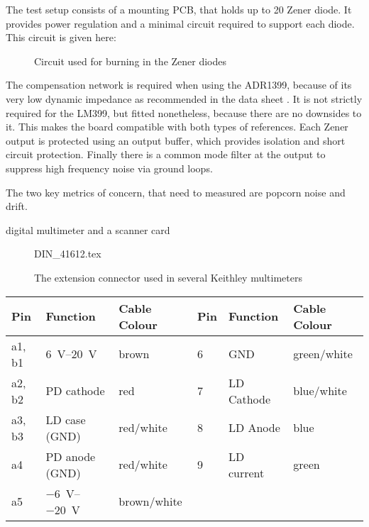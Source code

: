The test setup consists of a mounting PCB, that holds up to 20 Zener diode. It provides power regulation and a minimal circuit required to support each diode. This circuit is given here:

\begin{figure}[ht]
    \centering
    \caption{Circuit used for burning in the Zener diodes}
\end{figure}

The compensation network is required when using the ADR1399, because of its very low dynamic impedance as recommended in the data sheet \cite{datasheet_ADR1399}. It is not strictly required for the LM399, but fitted nonetheless, because there are no downsides to it. This makes the board compatible with both types of references. Each Zener output is protected using an output buffer, which provides isolation and short circuit protection. Finally there is a common mode filter at the output to suppress high frequency noise via ground loops.

The two key metrics of concern, that need to measured are popcorn noise and drift.

digital multimeter and a scanner card


\begin{figure}[ht]
    \centering
    {DIN_41612.tex}
    \caption{The extension connector used in several Keithley multimeters}
\end{figure}

\begin{table}[ht]
    \centering
    \begin{tabular}{llllll}
        \toprule
        Pin    & Function    & Cable Colour    & Pin    & Function    &  Cable Colour\\
        \midrule
        a1, b1    & \SIrange[explicit-sign=+]{6}{20}{\volt}    & brown    & \num{6}    & GND    & green/white\\
        a2, b2    & PD cathode    & red    & \num{7}    & LD Cathode    & blue/white\\
        a3, b3    & LD case (GND)    & red/white    & \num{8}    & LD Anode    & blue\\
        a4    & PD anode (GND)    & red/white    & \num{9}    & LD current    & green\\
        a5    & \SIrange{-6}{-20}{\volt}    & brown/white\\
        \bottomrule
    \end{tabular}
\end{table}

